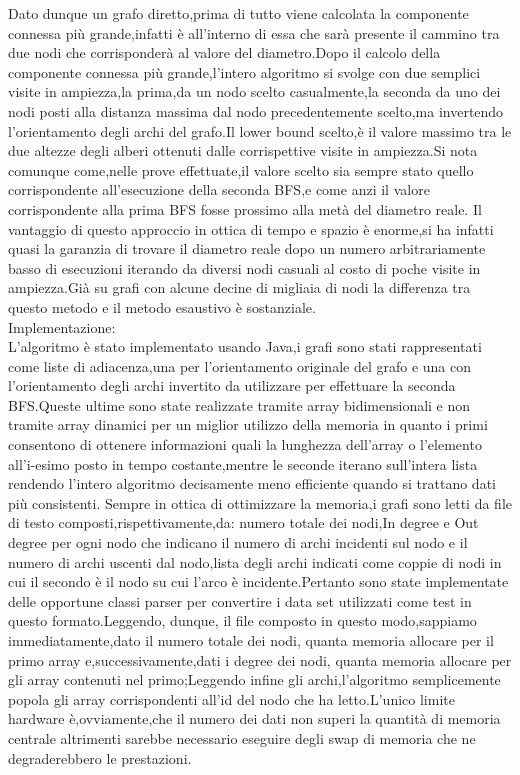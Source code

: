 \documentclass[]{article}
\begin{document}
Dato dunque un grafo diretto,prima di tutto viene calcolata la componente connessa più grande,infatti è all'interno di essa che sarà presente il cammino tra due nodi che corrisponderà al valore del diametro.Dopo il calcolo della componente connessa più grande,l'intero algoritmo si svolge con due semplici  visite in ampiezza,la prima,da un nodo scelto casualmente,la seconda da uno dei nodi posti alla distanza massima dal nodo precedentemente scelto,ma invertendo l'orientamento degli archi del grafo.Il lower bound scelto,è il valore massimo tra le due altezze degli alberi ottenuti dalle corrispettive visite in ampiezza.Si nota comunque come,nelle prove effettuate,il valore scelto sia sempre stato quello corrispondente all'esecuzione della seconda BFS,e come anzi il valore corrispondente alla prima BFS fosse prossimo alla metà del diametro reale.
Il vantaggio di questo approccio in ottica di tempo e spazio è enorme,si ha infatti quasi la garanzia di trovare il diametro reale dopo un numero arbitrariamente basso di esecuzioni iterando da diversi nodi casuali al costo di poche visite in ampiezza.Già su grafi con alcune decine di migliaia di nodi la differenza tra questo metodo e il metodo esaustivo è sostanziale.\\


Implementazione:\\
L'algoritmo è stato implementato usando Java,i grafi sono stati rappresentati come liste di adiacenza,una per l'orientamento originale del grafo e una con l'orientamento degli archi invertito da utilizzare per effettuare la seconda BFS.Queste ultime sono state realizzate tramite array bidimensionali e non tramite array dinamici per un miglior utilizzo della memoria  in quanto i primi consentono di ottenere informazioni quali la lunghezza dell'array o l'elemento all'i-esimo posto in tempo costante,mentre le seconde iterano sull'intera lista rendendo l'intero algoritmo decisamente meno efficiente quando si trattano dati più consistenti.
Sempre in ottica di ottimizzare la memoria,i grafi sono letti da file di testo composti,rispettivamente,da: numero totale dei nodi,In degree e Out degree per ogni nodo che indicano il numero di archi incidenti sul nodo e il numero di archi uscenti dal nodo,lista degli archi indicati come coppie di nodi in cui il secondo è il nodo su cui l'arco è incidente.Pertanto sono state implementate delle opportune classi parser  per convertire i data set utilizzati come test in questo formato.Leggendo, dunque, il file composto in questo modo,sappiamo immediatamente,dato il numero totale dei nodi, quanta memoria allocare per il primo array e,successivamente,dati i degree dei nodi, quanta memoria allocare per gli array contenuti nel primo;Leggendo infine gli archi,l'algoritmo semplicemente popola gli array corrispondenti all'id del nodo che ha letto.L'unico limite hardware è,ovviamente,che il numero dei dati non superi la quantità di memoria centrale altrimenti sarebbe necessario eseguire degli swap di memoria che ne degraderebbero le prestazioni.
\end{document}
